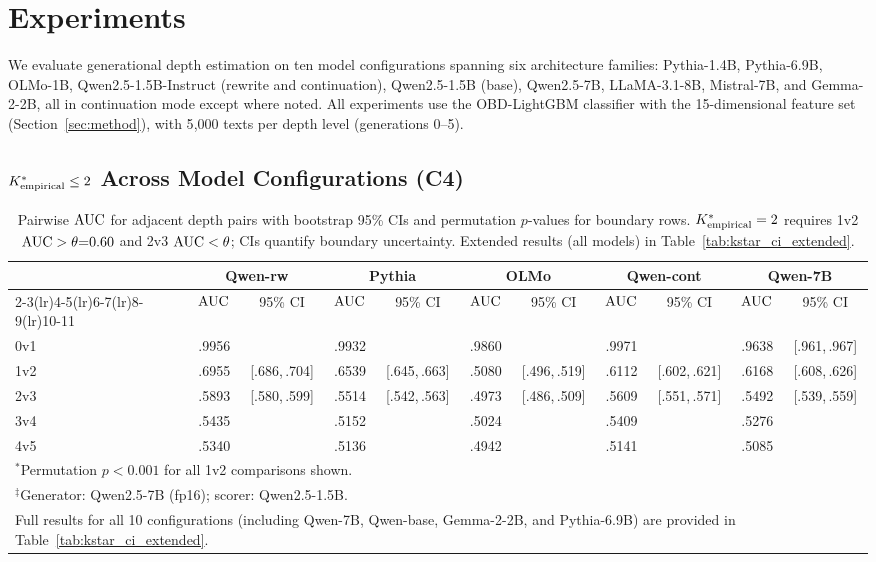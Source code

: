 \section{Experiments}
\label{sec:experiments}

We evaluate generational depth estimation on ten model configurations spanning six architecture families:
Pythia-1.4B, Pythia-6.9B, OLMo-1B, Qwen2.5-1.5B-Instruct (rewrite and continuation), Qwen2.5-1.5B (base), Qwen2.5-7B, LLaMA-3.1-8B, Mistral-7B, and Gemma-2-2B, all in continuation mode except where noted.
All experiments use the OBD-LightGBM classifier with the 15-dimensional feature set (Section~\ref{sec:method}), with 5{,}000 texts per depth level (generations 0--5).

\subsection{${K^*_{\text{empirical}}} \leq 2$ Across Model Configurations (C4)}
\label{sec:kstar_boundary}

\begin{table}[t]
\centering
\small
\caption{Pairwise $\text{AUC}$ for adjacent depth pairs with bootstrap 95\% CIs and permutation $p$-values for boundary rows.
${K^*_{\text{empirical}}} = 2$ requires 1v2 $\text{AUC} > \theta{=}0.60$ and 2v3 $\text{AUC} < \theta$; CIs quantify boundary uncertainty.
Extended results (all models) in Table~\ref{tab:kstar_ci_extended}.}
\label{tab:kstar_ci}
\begin{tabular}{lcccccccccc}
\toprule
 & \multicolumn{2}{c}{Qwen-rw} & \multicolumn{2}{c}{Pythia} & \multicolumn{2}{c}{OLMo} & \multicolumn{2}{c}{Qwen-cont} & \multicolumn{2}{c}{Qwen-7B\rlap{$^\ddagger$}} \\
\cmidrule(lr){2-3}\cmidrule(lr){4-5}\cmidrule(lr){6-7}\cmidrule(lr){8-9}\cmidrule(lr){10-11}
 & $\text{AUC}$ & 95\% CI & $\text{AUC}$ & 95\% CI & $\text{AUC}$ & 95\% CI & $\text{AUC}$ & 95\% CI & $\text{AUC}$ & 95\% CI \\
\midrule
0v1 & .9956 & & .9932 & & .9860 & & .9971 & & .9638 & [.961,\,.967] \\
1v2 & .6955 & [.686,\,.704]\rlap{$^*$} & .6539 & [.645,\,.663]\rlap{$^*$} & .5080 & [.496,\,.519] & .6112 & [.602,\,.621]\rlap{$^*$} & .6168 & [.608,\,.626]\rlap{$^*$} \\
2v3 & .5893 & [.580,\,.599] & .5514 & [.542,\,.563] & .4973 & [.486,\,.509] & .5609 & [.551,\,.571] & .5492 & [.539,\,.559] \\
3v4 & .5435 & & .5152 & & .5024 & & .5409 & & .5276 & \\
4v5 & .5340 & & .5136 & & .4942 & & .5141 & & .5085 & \\
\bottomrule
\multicolumn{11}{l}{\footnotesize $^*$Permutation $p < 0.001$ for all 1v2 comparisons shown.} \\
\multicolumn{11}{l}{\footnotesize $^\ddagger$Generator: Qwen2.5-7B (fp16); scorer: Qwen2.5-1.5B.} \\
\multicolumn{11}{l}{\footnotesize Full results for all 10 configurations (including Qwen-7B, Qwen-base, Gemma-2-2B, and Pythia-6.9B) are provided in Table~\ref{tab:kstar_ci_extended}.}
\end{tabular}
\end{table}

